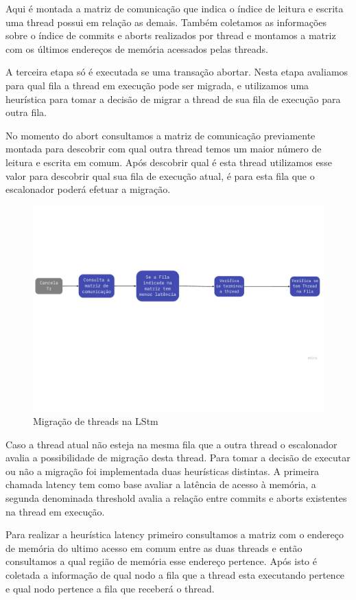 \documentclass[diss,capa]{texufpel}
\begin{document}
Aqui é montada a matriz de comunicação que indica o índice de leitura e escrita uma thread possui em relação as demais. Também coletamos as informações sobre o índice de commits e aborts realizados por thread e montamos a matriz com os últimos endereços de memória acessados pelas threads.

A terceira etapa só é executada se uma transação abortar. Nesta etapa avaliamos para qual fila a thread em execução pode ser migrada, e utilizamos uma heurística para tomar a decisão de migrar a thread de sua fila de execução para outra fila.

No momento do abort consultamos a matriz de comunicação previamente montada para descobrir com qual outra thread temos um maior número de leitura e escrita em comum. Após descobrir qual é esta thread utilizamos esse valor para descobrir qual sua fila de execução atual, é para esta fila que o escalonador poderá efetuar a migração.

\begin{figure}[htbp]
  \centering \includegraphics[scale=.5]{images/lstm2}
\caption{Migração de threads na LStm} 
\label{LStm2}
\end{figure}

Caso a thread atual não esteja na mesma fila que a outra thread o escalonador avalia a possibilidade de migração desta thread. Para tomar a decisão de executar ou não a migração foi implementada duas heurísticas distintas. A primeira chamada latency tem como base avaliar a latência de acesso à memória, a segunda denominada threshold avalia a relação entre commits e aborts existentes na thread em execução.

Para realizar a heurística latency primeiro consultamos a matriz com o endereço de memória do ultimo acesso em comum entre as duas threads e então consultamos a qual região de memória esse endereço pertence. Após isto é coletada a informação de qual nodo a fila que a thread esta executando pertence e qual nodo pertence a fila que receberá o thread.
\end{document}
